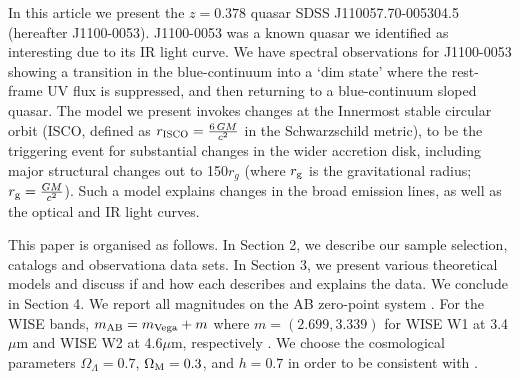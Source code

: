 \documentclass[a4paper,fleqn,usenatbib]{mnras}
\begin{document}
In this article we present the $z=0.378$ quasar SDSS
J110057.70-005304.5 (hereafter J1100-0053).  J1100-0053 was a known
quasar we identified as interesting due to its IR light curve. We have
spectral observations for J1100-0053 showing a transition in the
blue-continuum into a `dim state' where the rest-frame UV flux is
suppressed, and then returning to a blue-continuum sloped quasar.  The
model we present invokes changes at the Innermost stable circular
orbit (ISCO, defined as $r_{\textsc{ISCO}}={\frac {6\,GM}{c^{2}}}$ in
the Schwarzschild metric), to be the triggering event for substantial
changes in the wider accretion disk, including major structural
changes out to 150$r_{g}$ (where $r_{\rm g}$ is the gravitational
radius; $r_{\rm g}=\frac{GM}{c^2}$). Such a model explains changes in
the broad emission lines, as well as the optical and IR light curves.

This paper is organised as follows.  In Section 2, we describe
our sample selection, catalogs and observationa data sets.  In Section
3, we present various theoretical models and discuss if and how each
describes and explains the data.  We conclude in Section 4.  We
report all magnitudes on the AB zero-point system \citep{Oke_Gunn1983,
Fukugita1996}.  For the WISE bands, $m_{\rm AB} = m_{\rm Vega} + m$
where $m = (2.699, 3.339)$ for WISE W1 at 3.4$\mu$m and WISE W2 at
4.6$\mu$m, respectively \citep{Cutri2011}. We choose the
cosmological parameters $\Omega_{\Lambda} = 0.7$, $\Omega_{\rm M} =
0.3$, and $h = 0.7$ in order to be consistent with \citet{Shen2011}.
\end{document}
